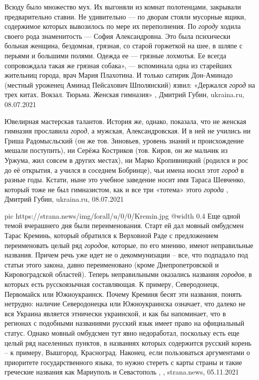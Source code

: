 Всюду было множество мух. Их выгоняли из комнат полотенцами, закрывали
предварительно ставни. Не удивительно — по дворам стояли мусорные ящики,
содержимое которых вывозилось по мере их переполнения.  По \emph{городу} ходила своего
рода знаменитость — София Александровна. Это была психически больная женщина,
бездомная, грязная, со старой горжеткой на шее, в шляпе с перьями и большими
полями. Одежда ее — грязные лохмотья. Ее всегда сопровождала такая же грязная
собака», — вспоминала одна из старейших жительниц города, врач Мария Плахотина.
И только сатирик Дон-Аминадо (местный уроженец Аминад Пейсахович Шполянский)
язвил: «Держался \emph{город} на трех китах. Вокзал. Тюрьма. Женская гимназия»
, Дмитрий Губин, ukraina.ru, 08.07.2021

Ювелирная мастерская талантов.
История же, однако, показала, что не женская гимназия прославила \emph{город}, а
мужская, Александровская. И в ней не учились ни Гриша Радомысльский (он же тов.
Зиновьев, уровень знаний и происхождение мешали поступить), ни Серёжа Костриков
(тов. Киров, он же мальчик из Уржума, жил совсем в других местах), ни Марко
Кропивницкий (родился и рос до её открытия, а учился в соседнем Бобринце), чьи
имена носил этот \emph{город} в разные годы. Кстати, ныне это учебное заведение носит
имя Тараса Шевченко, который тоже не был гимназистом, как и все три «тотема»
этого \emph{города}
, Дмитрий Губин, ukraina.ru, 08.07.2021

\ifcmt
  pic https://strana.news/img/forall/u/0/0/Kremin.jpg
  @width 0.4
\fi
Еще одной темой вчерашнего дня были переименования. Старт ей дал мовный
омбудсмен Тарас Креминь, который обратился к Верховной Раде с предложением
переименовать целый ряд \emph{городов}, которые, по его мнению, имеют неправильные
названия.  Причем речь уже идет не о декоммунизации – все, что подпадало под
статьи этого закона, давно переименовано (кроме Днепропетровской и
Кировоградской областей).  Теперь неправильными оказались названия \emph{городов}, в
которых есть русскоязычная составляющая. К примеру, Северодонецк, Первомайск
или Южноукраинск.  Почему Креминя бесят эти названия, понять нетрудно: наличие
Северодонецка или Южноукраинска означает, что далеко не вся Украина является
этнически украинской, и как бы напоминает, что в регионах с подобными
названиями русский язык имеет право на официальный статус.  Однако мовный
омбудсмен тут явно недоработал, поскольку есть еще целый ряд населенных
пунктов, в названиях которых содержится русский корень – к примеру, Вышгород,
Красноград.  Наконец, если пользоваться аргументами о приоритете
государственного языка, то нужно стереть с карты страны и такие греческие
названия как Мариуполь и Севастополь
, 
, strana.news, 05.11.2021
